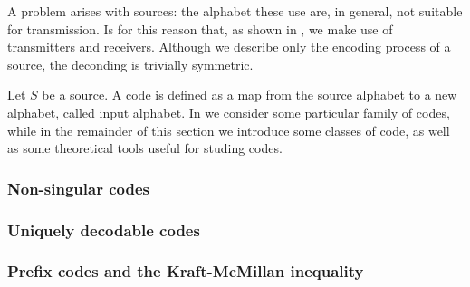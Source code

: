 \documentclass{subfiles}
\begin{document}
    A problem arises with sources: the alphabet these use are, in general, 
        not suitable for transmission. Is for this reason that,
        as shown in , we make use of transmitters and receivers.
        Although we describe only the encoding process of a source, 
        the deconding is trivially symmetric.

    Let \(S\) be a source. A code is defined as a map from the source alphabet 
        to a new alphabet, called input alphabet. In 
        we consider some particular family of codes, 
        while in the remainder of this section we introduce some classes of code,
        as well as some theoretical tools useful for studing codes.

    \subsubsection{Non-singular codes}
    

    \subsubsection{Uniquely decodable codes}
    

    \subsubsection{Prefix codes and the Kraft-McMillan inequality}
    
\end{document}
